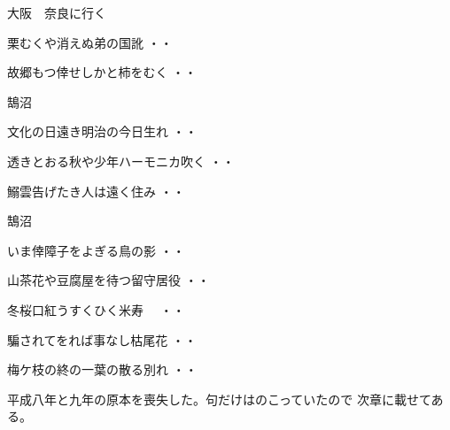 \vspace{0.4cm}
大阪　奈良に行く
\begin{shiika}栗むくや消えぬ弟の国訛
\hfill{・・}\end{shiika}
\begin{shiika}故郷もつ倖せしかと柿をむく
\hfill{・・}\end{shiika}
\vspace{0.4cm}
鵠沼
\begin{shiika}文化の日遠き明治の今日生れ
\hfill{・・}\end{shiika}
\begin{shiika}透きとおる秋や少年ハーモニカ吹く
\hfill{・・}\end{shiika}
\begin{shiika}鰯雲告げたき人は遠く住み
\hfill{・・}\end{shiika}
鵠沼
\begin{shiika}いま倖障子をよぎる鳥の影
\hfill{・・}\end{shiika}
\begin{shiika}山茶花や豆腐屋を待つ留守居役
\hfill{・・}\end{shiika}
\begin{shiika}冬桜口紅うすくひく米寿　
\hfill{・・}\end{shiika}
\begin{shiika}騙されてをれば事なし枯尾花
\hfill{・・}\end{shiika}
\begin{shiika}梅ケ枝の終の一葉の散る別れ
\hfill{・・}\end{shiika}
\vspace{0.4cm}
平成八年と九年の原本を喪失した。句だけはのこっていたので
次章に載せてある。
\endinput
\begin{shiika}いつまでも御元気でねてふ賀状の数　
\hfill{\rensuji*{8}・\rensuji*{0}・\rensuji*{0}}\end{shiika}
\vspace{0.4cm}
\begin{shiika}退職と一筆添へし賀状かな　　　　　
\hfill{\rensuji*{8}・\rensuji*{0}・\rensuji*{0}}\end{shiika}
\vspace{0.4cm}
\begin{shiika}初入日三六六の一を呑み
\hfill{\rensuji*{8}・\rensuji*{0}・\rensuji*{0}}\end{shiika}
